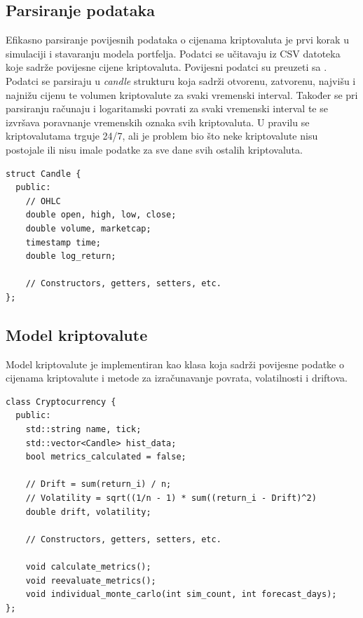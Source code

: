 \documentclass[zavrsnirad, upload]{fer}
\begin{document}
\subsection{Parsiranje podataka}
\label{sek:parsiranje_podataka}
Efikasno parsiranje povijesnih podataka o cijenama kriptovaluta
je prvi korak u simulaciji i stavaranju modela portfelja.
Podatci se učitavaju iz CSV datoteka koje sadrže povijesne cijene
kriptovaluta. Povijesni podatci su preuzeti sa \cite{kaggledataset}.
Podatci se parsiraju u \emph{candle} strukturu koja sadrži
otvorenu, zatvorenu, najvišu i najnižu cijenu te volumen
kriptovalute za svaki vremenski interval. Također se pri parsiranju
računaju i logaritamski povrati za svaki vremenski interval te se izvršava
poravnanje vremenskih oznaka svih kriptovaluta. U pravilu se kriptovalutama trguje
24/7, ali je problem bio što neke kriptovalute nisu postojale ili
nisu imale podatke za sve dane svih ostalih kriptovaluta.
\begin{lstlisting}[caption={Struktura \emph{candle} koja sadrži povijesne
podatke o cijenama kriptovaluta}, label={lst:candle}]
struct Candle {
  public:
    // OHLC
    double open, high, low, close;
    double volume, marketcap;
    timestamp time;
    double log_return;

    // Constructors, getters, setters, etc.
};
\end{lstlisting}

\subsection{Model kriptovalute}
\label{sek:model_kriptovalute}
Model kriptovalute je implementiran kao klasa koja
sadrži povijesne podatke o cijenama kriptovalute
i metode za izračunavanje povrata, volatilnosti
i driftova.
\begin{lstlisting}[caption={Model kriptovalute}, label={lst:kriptovaluta}]
class Cryptocurrency {
  public:
    std::string name, tick;
    std::vector<Candle> hist_data;
    bool metrics_calculated = false;

    // Drift = sum(return_i) / n;
    // Volatility = sqrt((1/n - 1) * sum((return_i - Drift)^2)
    double drift, volatility;

    // Constructors, getters, setters, etc.

    void calculate_metrics();
    void reevaluate_metrics();
    void individual_monte_carlo(int sim_count, int forecast_days);
};
\end{lstlisting}
\end{document}
